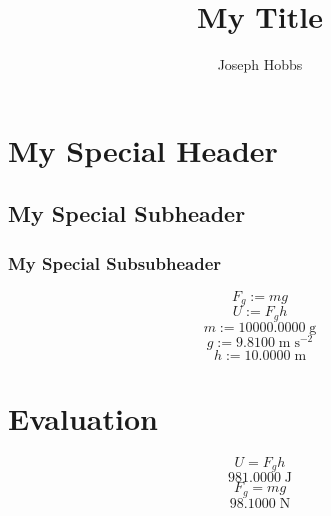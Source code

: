 \documentclass[12pt]{article}
\begin{document}
\title{\textbf{My Title}}
\author{Joseph Hobbs}
\maketitle
\tableofcontents


\section{My Special Header}




\subsection{My Special Subheader}




\subsubsection{My Special Subsubheader}


$$
F_{g} := m g
$$
$$
U := F_{g} h
$$
$$
m := 10000.0000 \; \mathrm{g}
$$
$$
g := 9.8100 \; \mathrm{m} \; \mathrm{s^{-2}}
$$
$$
h := 10.0000 \; \mathrm{m}
$$


\section{Evaluation}


$$
U = F_{g} h
$$
$$
981.0000 \; \mathrm{J}
$$
$$
F_{g} = m g
$$
$$
98.1000 \; \mathrm{N}
$$
\end{document}
